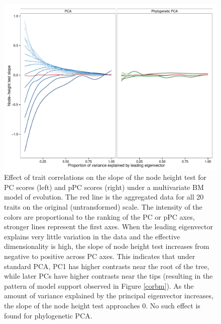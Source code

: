 \documentclass[a4paper,11pt]{article}
\begin{document}
\begin{figure}[p]
\centering
\includegraphics[scale=0.65]{./fig/onion.pdf}
\caption{Effect of trait correlations on the slope of the node height test for PC scores (left) and pPC scores (right) under a multivariate BM model of evolution. The red line is the aggregated data for all 20 traits on the original (untransformed) scale. The intensity of the colors are proportional to the ranking of the PC or pPC axes, stronger lines represent the first axes. When the leading eigenvector explains very little variation in the data and the effective dimensionality is high, the slope of node height test increases from negative to positive across PC axes. This indicates that under standard PCA, PC1 has higher contrasts near the root of the tree, while later PCs have higher contrasts near the tips (resulting in the pattern of model support observed in Figure \ref{corbm}). As the amount of variance explained by the principal eigenvector increases, the slope of the node height test approaches 0. No such effect is found for phylogenetic PCA.}
\label{rank}
\end{figure}
\end{document}
